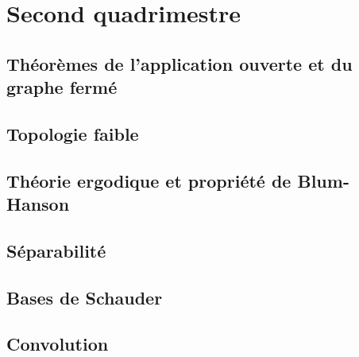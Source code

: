 \documentclass[a4paper, 12pt]{book}
\theoremstyle{definition} \newtheorem{df}{D\'{e}finition}[chapter]
\theoremstyle{definition} \newtheorem{ex}[df]{Exemple}
\theoremstyle{definition} \newtheorem{thm}[df]{Th\'{e}or\`{e}me}
\theoremstyle{definition} \newtheorem{cor}[df]{Corollaire}
\theoremstyle{definition} \newtheorem{lem}[df]{Lemme}
\theoremstyle{definition} \newtheorem{prop}[df]{Proposition}
\theoremstyle{definition} \newtheorem{rem}[df]{Remarque}
\theoremstyle{definition} \newtheorem{exo}{Exercice}[chapter]
\begin{document}
\part{Second quadrimestre}
\chapter{Théorèmes de l'application ouverte et du graphe fermé}



\chapter{Topologie faible}


\chapter{Théorie ergodique et propriété de Blum-Hanson}


\chapter{Séparabilité}


\chapter{Bases de Schauder}


\chapter{Convolution}

\appendix




\end{document}
